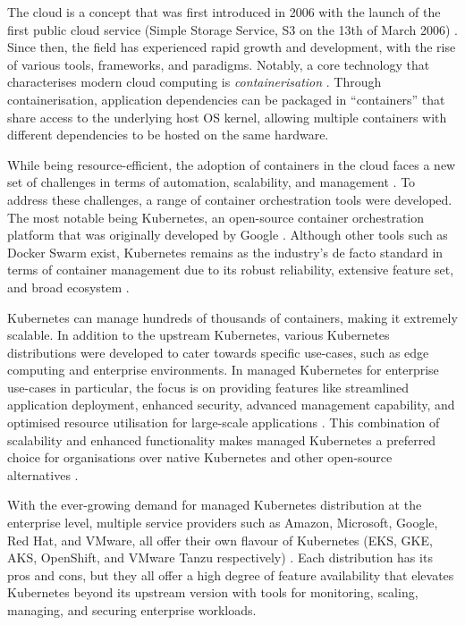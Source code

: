 The cloud is a concept that was first introduced in 2006 with the launch of the first public cloud service (Simple Storage Service, S3 on the 13th of March 2006) \cite{liuReviewDigitalTwin2021}. Since then, the field has experienced rapid growth and development, with the rise of various tools, frameworks, and paradigms. Notably, a core technology that characterises modern cloud computing is \textit{containerisation} \cite{pereiraferreiraPerformanceEvaluationContainers2019}. Through containerisation, application dependencies can be packaged in “containers” that share access to the underlying host OS kernel, allowing multiple containers with different dependencies to be hosted on the same hardware.

While being resource-efficient, the adoption of containers in the cloud faces a new set of challenges in terms of automation, scalability, and management \cite{pereiraferreiraPerformanceEvaluationContainers2019}. To address these challenges, a range of container orchestration tools were developed. The most notable being Kubernetes, an open-source container orchestration platform that was originally developed by Google \cite{Kubernetes, pereiraferreiraPerformanceEvaluationContainers2019}. Although other tools such as Docker Swarm exist, Kubernetes remains as the industry’s de facto standard in terms of container management due to its robust reliability, extensive feature set, and broad ecosystem \cite{truyenComprehensiveFeatureComparison2019}.

Kubernetes can manage hundreds of thousands of containers, making it extremely scalable. In addition to the upstream Kubernetes, various Kubernetes distributions were developed to cater towards specific use-cases, such as edge computing and enterprise environments. In managed Kubernetes for enterprise use-cases in particular, the focus is on providing features like streamlined application deployment, enhanced security, advanced management capability, and optimised resource utilisation for large-scale applications \cite{WhatEnterpriseKubernetes, truyenComprehensiveFeatureComparison2019, jiangIndustrialApplicationsDigital2021}. This combination of scalability and enhanced functionality makes managed Kubernetes a preferred choice for organisations over native Kubernetes and other open-source alternatives \cite{redhatinc.StateKubernetesSecurity2024, vrabicDigitalTwinsUnderstanding2018, portworxKubernetesAdoptionSurvey2021, broadcomStateKubernetes20232023}.

With the ever-growing demand for managed Kubernetes distribution at the enterprise level, multiple service providers such as Amazon, Microsoft, Google, Red Hat, and VMware, all offer their own flavour of Kubernetes (EKS, GKE, AKS, OpenShift, and VMware Tanzu respectively) \cite{AmazonEKSCustomers, maEurekaHumanLevelReward2023, nickomangAzureKubernetesService, redhatinc.RedHatOpenShift, VMwareTanzuPlatform}. Each distribution has its pros and cons, but they all offer a high degree of feature availability that elevates Kubernetes beyond its upstream version with tools for monitoring, scaling, managing, and securing enterprise workloads.

